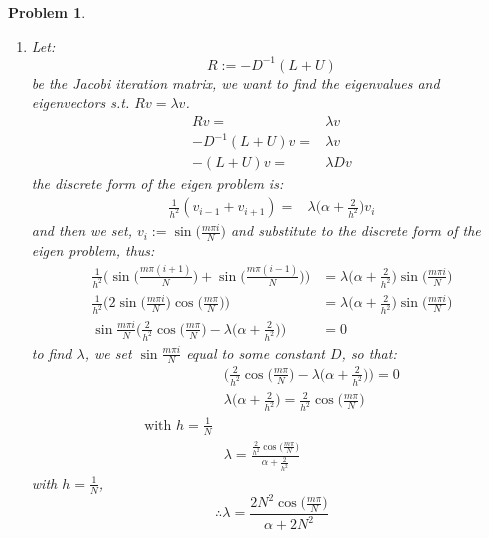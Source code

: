 \documentclass[a4paper,12pt]{article}
\newtheorem{prob}{Problem}[]
\begin{document}
\begin{prob}
\begin{enumerate}[label=(\alph*)]
		\item Let:
		\begin{equation*}
		R := -D^{-1}(L+U)
		\end{equation*}
		be the Jacobi iteration matrix, we want to find the eigenvalues and eigenvectors s.t. $Rv = \lambda v$.
		\begin{equation*}
		\begin{aligned}
		Rv =& \lambda v\\
		-D^{-1}(L+U) v =& \lambda v\\
		-(L+U) v =& \lambda D v
		\end{aligned}
		\end{equation*}
		the discrete form of the eigen problem is:
		\begin{equation*}
		\begin{aligned}
		\frac{1}{h^2}(v_{i-1} + v_{i+1}) =& \lambda \bigg( \alpha + \frac{2}{h^2} \bigg) v_i
		\end{aligned}
		\end{equation*}
		and then we set, $v_i := \sin\big(\frac{m\pi i}{N}\big)$ and substitute to the discrete form of the eigen problem, thus:
		\begin{equation*}
		\begin{aligned}
		\frac{1}{h^2} \bigg(\sin\bigg(\frac{m\pi (i+1)}{N}\bigg) + \sin\bigg(\frac{m\pi (i-1)}{N}\bigg)\bigg) &= \lambda \bigg( \alpha + \frac{2}{h^2} \bigg) \sin\bigg(\frac{m\pi i}{N}\bigg)\\
		\frac{1}{h^2} \bigg(2\sin\bigg(\frac{m\pi i}{N}\bigg) \cos\bigg(\frac{m\pi}{N}\bigg)\bigg) &= \lambda \bigg( \alpha + \frac{2}{h^2} \bigg) \sin\bigg(\frac{m\pi i}{N}\bigg)\\
		\sin\frac{m\pi i}{N} \bigg( \frac{2}{h^2} \cos\bigg(\frac{m\pi}{N}\bigg) - \lambda \bigg( \alpha + \frac{2}{h^2} \bigg) \bigg) &= 0
		\end{aligned}
		\end{equation*}
		to find $\lambda$, we set $\sin\frac{m\pi i}{N}$ equal to some constant $D$, so that:
		\begin{equation}\label{eq:4}
		\begin{aligned}
		&\bigg( \frac{2}{h^2} \cos\bigg(\frac{m\pi}{N}\bigg) - \lambda \bigg( \alpha + \frac{2}{h^2} \bigg) \bigg) = 0\\
		&\lambda \bigg( \alpha + \frac{2}{h^2} \bigg) = \frac{2}{h^2} \cos\bigg(\frac{m\pi}{N}\bigg)\\
		\text{with $h=\frac{1}{N}$}\\
		&\lambda = \frac{\frac{2}{h^2} \cos\big(\frac{m\pi}{N}\big)}{\alpha + \frac{2}{h^2}}
		\end{aligned}
		\end{equation}
		with $h=\frac{1}{N}$, $$\therefore \lambda = \frac{2N^2 \cos\big(\frac{m\pi}{N}\big)}{\alpha + 2N^2}$$
		

\end{enumerate}
\end{prob}
\end{document}
